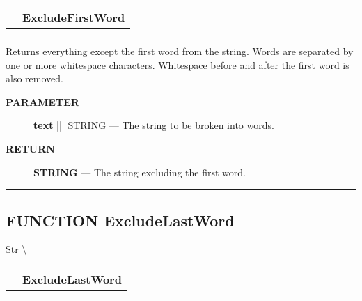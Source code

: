 {\renewcommand{\arraystretch}{1.5}
\begin{tabularx}{\textwidth}{|>{\raggedright\arraybackslash}l|X|}
\hline
\hspace{0pt}\mytexttt{\color{red} } & \textbf{ExcludeFirstWord} \\
\hline
\multicolumn{2}{|>{\raggedright\arraybackslash}X|}{\hspace{0pt}\mytexttt{\color{param} (STRING text)}} \\
\hline
\end{tabularx}
}

\par





Returns everything except the first word from the string. Words are separated by one or more whitespace characters. Whitespace before and after the first word is also removed.






\par
\begin{description}
\item [\colorbox{tagtype}{\color{white} \textbf{\textsf{PARAMETER}}}] \textbf{\underline{text}} ||| STRING --- The string to be broken into words.
\end{description}







\par
\begin{description}
\item [\colorbox{tagtype}{\color{white} \textbf{\textsf{RETURN}}}] \textbf{STRING} --- The string excluding the first word.
\end{description}




\rule{\linewidth}{0.5pt}
\subsection*{\textsf{\colorbox{headtoc}{\color{white} FUNCTION}
ExcludeLastWord}}

\hypertarget{ecldoc:str.excludelastword}{}
\hspace{0pt} \hyperlink{ecldoc:Str}{Str} \textbackslash 

{\renewcommand{\arraystretch}{1.5}
\begin{tabularx}{\textwidth}{|>{\raggedright\arraybackslash}l|X|}
\hline
\hspace{0pt}\mytexttt{\color{red} } & \textbf{ExcludeLastWord} \\
\hline
\multicolumn{2}{|>{\raggedright\arraybackslash}X|}{\hspace{0pt}\mytexttt{\color{param} (STRING text)}} \\
\hline
\end{tabularx}
}


